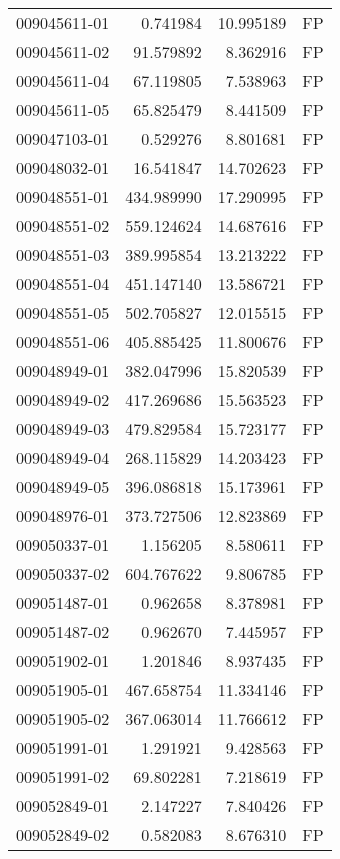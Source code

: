 \begin{tabular}{lrrl}
009045611-01 &    0.741984 &    10.995189 &   FP \\
009045611-02 &   91.579892 &     8.362916 &   FP \\
009045611-04 &   67.119805 &     7.538963 &   FP \\
009045611-05 &   65.825479 &     8.441509 &   FP \\
009047103-01 &    0.529276 &     8.801681 &   FP \\
009048032-01 &   16.541847 &    14.702623 &   FP \\
009048551-01 &  434.989990 &    17.290995 &   FP \\
009048551-02 &  559.124624 &    14.687616 &   FP \\
009048551-03 &  389.995854 &    13.213222 &   FP \\
009048551-04 &  451.147140 &    13.586721 &   FP \\
009048551-05 &  502.705827 &    12.015515 &   FP \\
009048551-06 &  405.885425 &    11.800676 &   FP \\
009048949-01 &  382.047996 &    15.820539 &   FP \\
009048949-02 &  417.269686 &    15.563523 &   FP \\
009048949-03 &  479.829584 &    15.723177 &   FP \\
009048949-04 &  268.115829 &    14.203423 &   FP \\
009048949-05 &  396.086818 &    15.173961 &   FP \\
009048976-01 &  373.727506 &    12.823869 &   FP \\
009050337-01 &    1.156205 &     8.580611 &   FP \\
009050337-02 &  604.767622 &     9.806785 &   FP \\
009051487-01 &    0.962658 &     8.378981 &   FP \\
009051487-02 &    0.962670 &     7.445957 &   FP \\
009051902-01 &    1.201846 &     8.937435 &   FP \\
009051905-01 &  467.658754 &    11.334146 &   FP \\
009051905-02 &  367.063014 &    11.766612 &   FP \\
009051991-01 &    1.291921 &     9.428563 &   FP \\
009051991-02 &   69.802281 &     7.218619 &   FP \\
009052849-01 &    2.147227 &     7.840426 &   FP \\
009052849-02 &    0.582083 &     8.676310 &   FP \\

\end{tabular}
